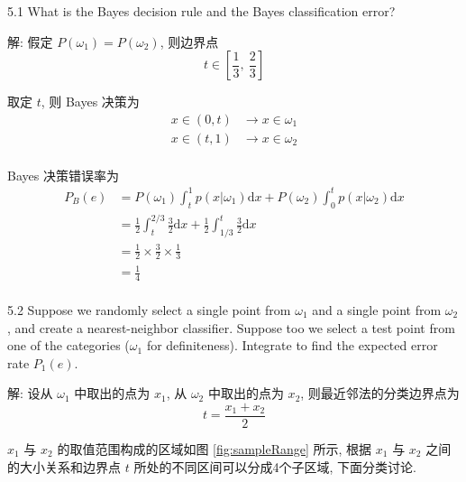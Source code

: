 \documentclass{article}
\begin{document}
5.1  What is the Bayes decision rule and the Bayes classification error?

解: 假定 $P(\omega_1)=P(\omega_2)$, 则边界点
\begin{equation}
  t\in\left[\frac{1}{3},~\frac{2}{3}\right]
\end{equation}

取定 $t$, 则 Bayes 决策为
\begin{equation}
  \begin{aligned}
    x\in(0,t)&\to x\in\omega_1\\
    x\in(t,1)&\to x\in\omega_2\\
  \end{aligned}
\end{equation}

Bayes 决策错误率为
\begin{equation}
  \begin{aligned}
    P_B(e)
    &=P(\omega_1)\int_{t}^1p(x|\omega_1)\mathrm{d}x+P(\omega_2)\int_{0}^tp(x|\omega_2)\mathrm{d}x\\
    &=\frac{1}{2}\int_{t}^{2/3}\frac{3}{2}\mathrm{d}x+\frac{1}{2}\int_{1/3}^{t}\frac{3}{2}\mathrm{d}x\\
    &=\frac{1}{2}\times\frac{3}{2}\times\frac{1}{3}\\
    &=\frac{1}{4}\\
  \end{aligned}
\end{equation}

5.2 Suppose we randomly select a single point from $\omega_{1}$ and a single point from $\omega_{2}$, and create a nearest-neighbor classifier. Suppose too we select a test point from one of the categories ($\omega_{1}$ for definiteness). Integrate to find the expected error rate $P_{1}(e)$.

解: 设从 $\omega_1$ 中取出的点为 $x_1$, 从 $\omega_2$ 中取出的点为 $x_2$, 则最近邻法的分类边界点为
\begin{equation}
  t=\frac{x_1+x_2}{2}
\end{equation}

$x_1$ 与 $x_2$ 的取值范围构成的区域如图 \ref{fig:sampleRange} 所示, 根据 $x_1$ 与 $x_2$ 之间的大小关系和边界点 $t$ 所处的不同区间可以分成4个子区域, 下面分类讨论.
\end{document}
